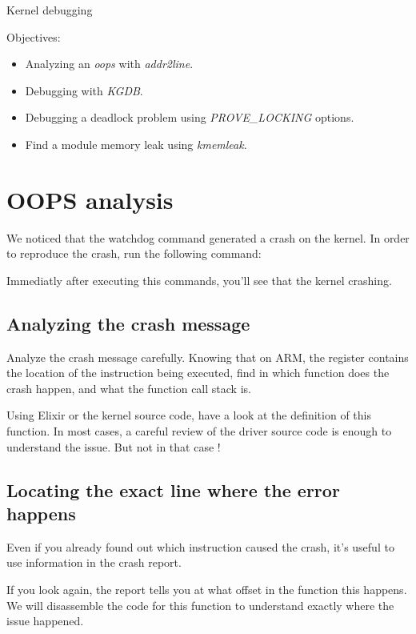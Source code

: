 \subchapter
{Kernel debugging}
{Objectives:
  \begin{itemize}
    \item Analyzing an {\em oops} with {\em addr2line}.
    \item Debugging with {\em KGDB}.
    \item Debugging a deadlock problem using {\em PROVE\_LOCKING} options.
    \item Find a module memory leak using {\em kmemleak}.
  \end{itemize}
}

\section{OOPS analysis}
We noticed that the watchdog command generated a crash on the kernel. In order
to reproduce the crash, run the following command:


Immediatly after executing this commands, you'll see that the kernel crashing.

\subsection{Analyzing the crash message}

Analyze the crash message carefully. Knowing that on ARM, the 
register contains the location of the instruction being executed, find
in which function does the crash happen, and what the function call
stack is.

Using Elixir or the kernel source code, have a look at the definition of this
function. In most cases, a careful review of the driver source code is enough
to understand the issue. But not in that case !

\subsection{Locating the exact line where the error happens}

Even if you already found out which instruction caused the crash, it's
useful to use information in the crash report.

If you look again, the report tells you at what offset in the function
this happens. We will disassemble the code for this function to understand
exactly where the issue happened.

